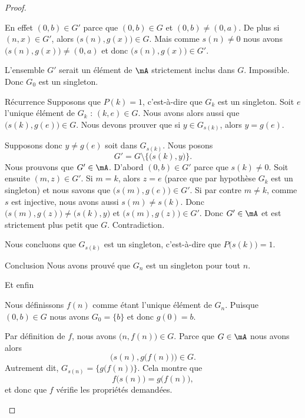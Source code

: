 \begin{proof}
\begin{subproof}
\begin{subproof}
			En effet \( (0,b)\in G'\) parce que \( (0,b)\in G\) et \( (0,b)\neq (0,a)\). De plus si \( (n,x)\in G'\), alors \( \big( s(n),g(x) \big)\in G\). Mais comme \( s(n)\neq 0\) nous avons \( \big( s(n),g(x) \big)\neq (0,a)\) et donc \( \big( s(n),g(x) \big)\in G'\).

			L'ensemble \( G'\) serait un élément de \( \mA\) strictement inclus dans \( G\). Impossible. Donc \( G_0\) est un singleton.

			\item[Récurrence]
			Supposons que \( P(k)=1\), c'est-à-dire que \( G_k\) est un singleton. Soit \( e\) l'unique élément de \( G_k\) : \( (k,e)\in G\). Nous avons alors aussi que \( \big( s(k),g(e) \big)\in G\). Nous devons prouver que si \( y\in G_{s(k)}\), alors \( y=g(e)\).

			Supposons donc \( y\neq g(e)\) soit dans \( G_{s(k)}\). Nous posons
			\begin{equation}
				G'=G\setminus\{ \big( s(k),y \big) \}.
			\end{equation}
			Nous prouvons que \( G'\in\mA\). D'abord \( (0,b)\in G'\) parce que \( s(k)\neq 0\). Soit ensuite \( (m,z)\in G'\). Si \( m=k\), alors \( z=e\) (parce que par hypothèse \( G_k\) est un singleton) et nous savons que \( \big( s(m),g(e) \big)\in G'\). Si par contre \( m\neq k\), comme  \( s\) est injective, nous avons aussi \( s(m)\neq s(k)\). Donc \( \big( s(m),g(z) \big)\neq \big( s(k),y \big)\) et \( \big( s(m),g(z) \big)\in G'\). Donc \( G'\in \mA\) et est strictement plus petit que \( G\). Contradiction.

			Nous concluons que \( G_{s(k)}\) est un singleton, c'est-à-dire que \( P\big( s(k) \big)=1\).
			\item[Conclusion]
			Nous avons prouvé que \( G_n\) est un singleton pour tout \( n\).
		\end{subproof}

		\item[Et enfin]

		Nous définissons \( f(n)\) comme étant l'unique élément de \( G_n\). Puisque \( (0,b)\in G\) nous avons \( G_0=\{ b \}\) et donc \( g(0)=b\).

		Par définition de \( f\), nous avons \( \big( n,f(n) \big)\in G\). Parce que \( G\in\mA\) nous avons alors
		\begin{equation}
			\big( s(n),g\big( f(n) \big) \big)\in G.
		\end{equation}
		Autrement dit, \( G_{s(n)}= \{  g\big( f(n) \big) \}\). Cela montre que
		\begin{equation}
			f\big( s(n) \big)=g\big( f(n) \big),
		\end{equation}
		et donc que \( f\) vérifie les propriétés demandées.
	\end{subproof}
\end{proof}


